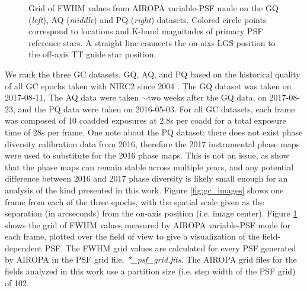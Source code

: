 \documentclass[]{spie}  %
\begin{document}
\begin{figure}
 \caption{\footnotesize Grid of FWHM values from AIROPA variable-PSF mode on the GQ (\textit{left}), AQ (\textit{middle}) and PQ (\textit{right}) datasets. Colored circle points correspond to locations and K-band magnitudes of primary PSF reference stars. A straight line connects the on-aixs LGS position to the off-axis TT guide star position. \label{fig:fwhm_grids}}
\end{figure}

\indent We rank the three GC datasets, GQ, AQ, and PQ based on the historical quality of all GC epochs taken with NIRC2 since 2004 \cite{jia:2019a}. The GQ dataset was taken on 2017-08-11, The AQ data were taken $\sim$two weeks after the GQ data, on 2017-08-23, and the PQ data were taken on 2016-05-03. For all GC datasets, each frame was composed of 10 coadded exposures at 2.8s per coadd for a total exposure time of 28s per frame. One note about the PQ dataset; there does not exist phase diversity calibration data from 2016, therefore the 2017 instrumental phase maps were used to substitute for the 2016 phase maps. This is not an issue, as \cite{Ciurlo:inprep} show that the phase maps can remain stable across multiple years, and any potential difference between 2016 and 2017 phase diversity is likely small enough for an analysis of the kind presented in this work. Figure \ref{fig:gc_images} shows one frame from each of the three epochs, with the spatial scale given as the separation (in arcseconds) from the on-axis position (i.e. image center). Figure \ref{fig:fwhm_grids} shows the grid of FWHM values measured by AIROPA variable-PSF mode for each frame, plotted over the field of view to give a visualization of the field-dependent PSF. The FWHM grid values are calculated for every PSF generated by AIROPA in the PSF grid file, \textit{*\_psf\_grid.fits}. The AIROPA grid files for the fields analyzed in this work use a partition size (i.e. step width of the PSF grid) of 102. 
\end{document}
